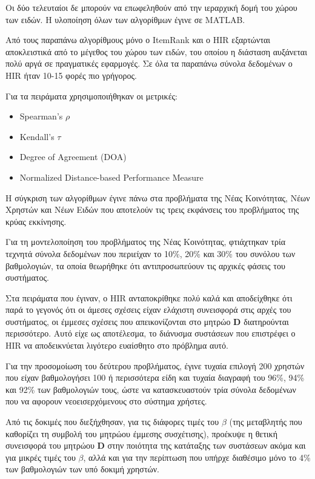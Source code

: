 Οι δύο τελευταίοι δε μπορούν να επωφεληθούν από την ιεραρχική δομή του χώρου των ειδών. Η υλοποίηση όλων των αλγορίθμων έγινε σε {\en MATLAB}. \par
Από τους παραπάνω αλγορίθμους μόνο ο {\en ItemRank} και ο {\en HIR} εξαρτώνται αποκλειστικά από το μέγεθος του χώρου των ειδών, του οποίου η διάσταση αυξάνεται πολύ αργά σε πραγματικές εφαρμογές. Σε όλα τα παραπάνω σύνολα δεδομένων ο {\en HIR} ήταν 10-15 φορές πιο γρήγορος. \par
Για τα πειράματα χρησιμοποιήθηκαν οι μετρικές:
\begin{itemize}
 \item {\en Spearman's $\rho$}
 \item {\en Kendall's $\tau$}
 \item {\en Degree of Agreement (DOA)}
 \item {\en Normalized Distance-based Performance Measure}
\end{itemize}\par
H σύγκριση των αλγορίθμων έγινε πάνω στα προβλήματα της Νέας Κοινότητας, Νέων Χρηστών και Νέων Ειδών που αποτελούν τις τρεις 
εκφάνσεις του προβλήματος της κρύας εκκίνησης. \par
Για τη μοντελοποίηση του προβλήματος της Νέας Κοινότητας, φτιάχτηκαν τρία τεχνητά σύνολα δεδομένων που περιείχαν το 10\%, 20\% και 30\% του συνόλου των βαθμολογιών, τα οποία θεωρήθηκε ότι αντιπροσωπεύουν τις αρχικές φάσεις του συστήματος. \par
Στα πειράματα που έγιναν, ο {\en HIR} ανταποκρίθηκε πολύ καλά και αποδείχθηκε ότι παρά το γεγονός ότι οι άμεσες σχέσεις είχαν ελάχιστη συνεισφορά στις αρχές του συστήματος, οι έμμεσες σχέσεις που απεικονίζονται στο μητρώο $\mathbf{D}$ διατηρούνται περισσότερο. Αυτό είχε ως αποτέλεσμα, το διάνυσμα συστάσεων που επιστρέφει ο {\en HIR} να αποδεικνύεται λιγότερο ευαίσθητο στο πρόβλημα αυτό.\par
Για την προσομοίωση του δεύτερου προβλήματος, έγινε τυχαία επιλογή 200 χρηστών που είχαν βαθμολογήσει 100 ή περισσότερα είδη και τυχαία διαγραφή του 96\%, 94\% και 92\% των βαθμολογιών τους, ώστε να κατασκευαστούν τρία σύνολα δεδομένων που να αφορουν νεοεισερχόμενους στο σύστημα χρήστες. \par
Από τις δοκιμές που διεξήχθησαν, για τις διάφορες τιμές του $\beta$ (της μεταβλητής που καθορίζει τη συμβολή του μητρώου έμμεσης συσχέτισης), προέκυψε η θετική συνεισφορά του μητρώου $\mathbf{D}$ στην ποιότητα της κατάταξης των συστάσεων ακόμα και για μικρές τιμές του $\beta$, αλλά και για την περίπτωση που υπήρχε διαθέσιμο μόνο το 4\% των βαθμολογιών των υπό δοκιμή χρηστών. \par
